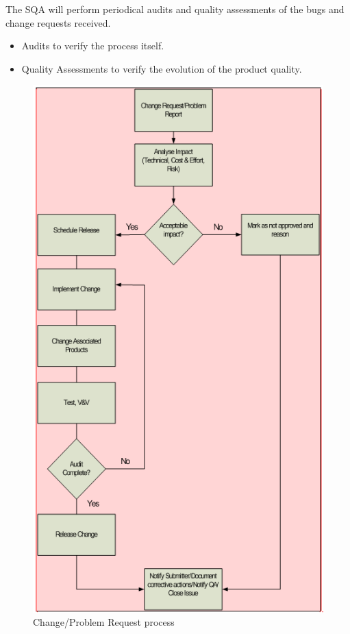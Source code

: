\documentclass{template/openetcs_article}
\begin{document}
The SQA will perform periodical audits and quality assessments of the bugs and change requests received. 

\begin{itemize}
\item Audits to verify the process itself.
\item Quality Assessments to verify the evolution of the product quality. 
\end{itemize}

 
\begin{figure}
\centering
\includegraphics[scale=1.3]{./figures/changerequest.PNG}
\caption{Change/Problem Request process}
\end{figure}
\end{document}
